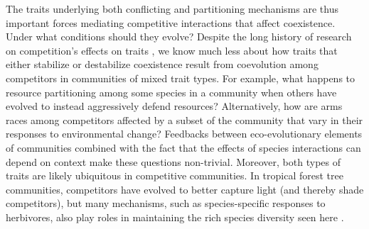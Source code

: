 The traits underlying both conflicting and partitioning mechanisms 
are thus important forces mediating competitive interactions that 
affect coexistence.
Under what conditions should they evolve?
Despite the long history of research on competition's effects on traits
\citep[e.g., ][]{Schreiber2011,Taper1992,Pastore2021,Abrams1983a,Roughgarden1976,Vasseur2011a}, 
we know much less about how traits that either stabilize or destabilize
coexistence result from coevolution among competitors in communities of 
mixed trait types.
For example, what happens to resource partitioning among some species in a
community when others have evolved to instead aggressively defend resources?
Alternatively, how are arms races among competitors affected by a subset of 
the community that vary in their responses to environmental change?
Feedbacks between eco-evolutionary elements of communities combined with 
the fact that the effects of species interactions can depend on context
\citep{Saavedra2017, Song2020}
make these questions non-trivial.
Moreover, both types of traits are likely ubiquitous in competitive communities.
In tropical forest tree communities, competitors have evolved to better capture
light (and thereby shade competitors), but many mechanisms, such as
species-specific responses to herbivores, also play roles in maintaining 
the rich species diversity seen here \citep{Wright2002}.








